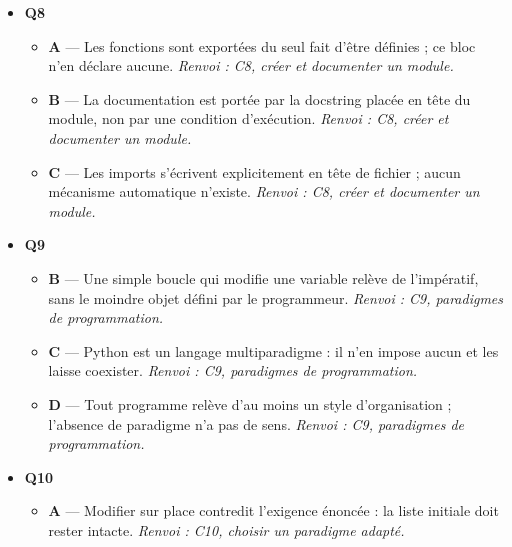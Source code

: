 \begin{itemize}
\begin{itemize}
    \item \textbf{A} — Modifier une dépendance pour éviter d'en lire le contrat est disproportionné, et rend toute mise à jour impossible. \emph{Renvoi : C7, exploiter une documentation.}
    \item \textbf{B} — Cette mention s'adresse au contraire à l'appelant : elle décrit ce qu'il recevra, et donc ce qu'il doit prévoir. \emph{Renvoi : C7, exploiter une documentation.}
    \item \textbf{D} — La documentation avertit précisément du contraire. L'ignorer conduira à manipuler  comme s'il s'agissait d'une valeur. \emph{Renvoi : C7, exploiter une documentation.}
  \end{itemize}
  \item \textbf{Q8}
  \begin{itemize}
    \item \textbf{A} — Les fonctions sont exportées du seul fait d'être définies ; ce bloc n'en déclare aucune. \emph{Renvoi : C8, créer et documenter un module.}
    \item \textbf{B} — La documentation est portée par la docstring placée en tête du module, non par une condition d'exécution. \emph{Renvoi : C8, créer et documenter un module.}
    \item \textbf{C} — Les imports s'écrivent explicitement en tête de fichier ; aucun mécanisme automatique n'existe. \emph{Renvoi : C8, créer et documenter un module.}
  \end{itemize}
  \item \textbf{Q9}
  \begin{itemize}
    \item \textbf{B} — Une simple boucle  qui modifie une variable relève de l'impératif, sans le moindre objet défini par le programmeur. \emph{Renvoi : C9, paradigmes de programmation.}
    \item \textbf{C} — Python est un langage multiparadigme : il n'en impose aucun et les laisse coexister. \emph{Renvoi : C9, paradigmes de programmation.}
    \item \textbf{D} — Tout programme relève d'au moins un style d'organisation ; l'absence de paradigme n'a pas de sens. \emph{Renvoi : C9, paradigmes de programmation.}
  \end{itemize}
  \item \textbf{Q10}
  \begin{itemize}
    \item \textbf{A} — Modifier sur place contredit l'exigence énoncée : la liste initiale doit rester intacte. \emph{Renvoi : C10, choisir un paradigme adapté.}

\end{itemize}
\end{itemize}
